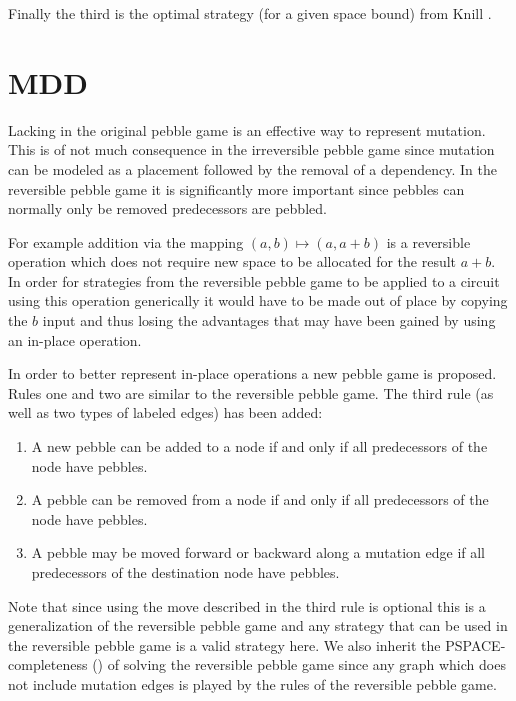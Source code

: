 Finally the third is the optimal strategy (for a given space bound) from Knill \cite{knill:95}.

\section{MDD}

Lacking in the original pebble game is an effective way to represent mutation.
This is of not much consequence in the irreversible pebble game since mutation
can be modeled as a placement followed by the removal of a dependency. In the
reversible pebble game it is significantly more important since pebbles can
normally only be removed predecessors are pebbled.

For example addition via the mapping $(a,b) \mapsto (a,a+b)$ is a reversible
operation which does not require new space to be allocated for the result $a+b$.
In order for strategies from the reversible pebble game to be applied to a
circuit using this operation generically it would have to be made out of place
by copying the $b$ input and thus losing the advantages that may have been
gained by using an in-place operation.

In order to better represent in-place operations a new pebble game is proposed.
Rules one and two are similar to the reversible pebble game. The third rule
(as well as two types of labeled edges) has been added:

\begin{enumerate}

   \item A new pebble can be added to a node if and only if all predecessors of
     the node have pebbles.

   \item A pebble can be removed from a node if and only if all predecessors of
     the node have pebbles.

   \item A pebble may be moved forward or backward along a mutation edge if all
     predecessors of the destination node have pebbles.

\end{enumerate}

Note that since using the move described in the third rule is optional this is a
generalization of the reversible pebble game and any strategy that can be used
in the reversible pebble game is a valid strategy here. We also inherit the
PSPACE-completeness (\cite{chan13}) of solving the reversible pebble game since
any graph which does not include mutation edges is played by the rules of the
reversible pebble game.

